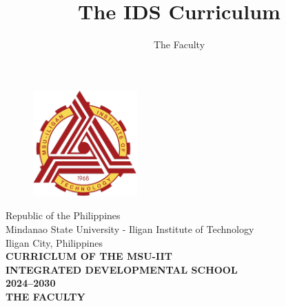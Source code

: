 \documentclass[a4paper, 11pt, titlepage]{article}
\title{The IDS Curriculum}
\author{The Faculty}
\begin{document}
\thispagestyle{empty}
\begin{figure}
    \centering
    \includegraphics[width=4cm]{IIT_logo.png}
\end{figure}

\begin{center}	
	{
	Republic of the Philippines\\
	Mindanao State University - Iligan Institute of Technology\\
	Iligan City, Philippines\\
	\vspace*{3cm}	
	\huge \bf CURRICLUM OF THE MSU-IIT\\
	INTEGRATED DEVELOPMENTAL SCHOOL\\
	\vspace{1cm}
	2024--2030\\
	\vfill
	\large
	THE FACULTY\\
	\pagebreak}
\end{center}	

\newpage
\tableofcontents





\end{document}
